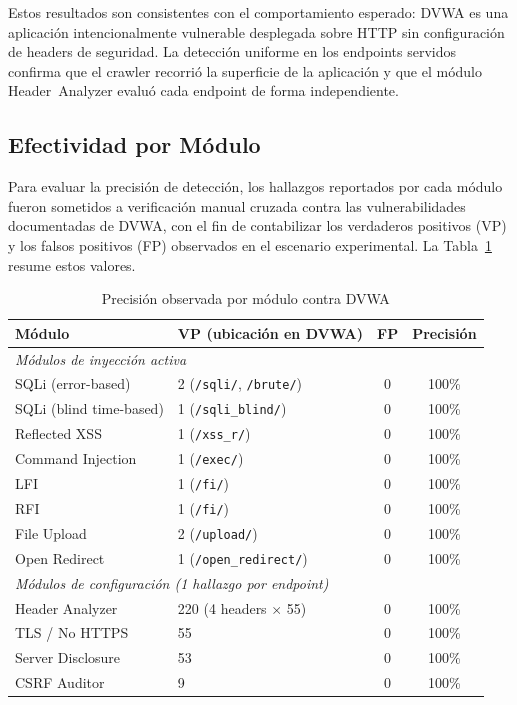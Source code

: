 \documentclass[12pt, a4paper]{article}
\begin{document}
Estos resultados son consistentes con el comportamiento esperado: DVWA es una
aplicación intencionalmente vulnerable desplegada sobre HTTP sin configuración
de headers de seguridad. La detección uniforme en los endpoints servidos
confirma que el crawler recorrió la superficie de la aplicación y que el
módulo Header~Analyzer evaluó cada endpoint de forma independiente.

\subsection{Efectividad por Módulo}

Para evaluar la precisión de detección, los hallazgos reportados por cada
módulo fueron sometidos a verificación manual cruzada contra las
vulnerabilidades documentadas de DVWA, con el fin de contabilizar los
verdaderos positivos (VP) y los falsos positivos (FP) observados en el
escenario experimental. La Tabla~\ref{tab:efectividad} resume estos valores.

\begin{table}[H]
    \centering
    \caption{Precisión observada por módulo contra DVWA}
    \label{tab:efectividad}
    \small
    \begin{tabular}{p{4cm} p{4.2cm} c c}
        \toprule
        \textbf{Módulo} & \textbf{VP (ubicación en DVWA)} & \textbf{FP} &
        \textbf{Precisión} \\
        \midrule
        \multicolumn{4}{l}{\textit{Módulos de inyección activa}} \\
        SQLi (error-based)  & 2 (\texttt{/sqli/}, \texttt{/brute/}) & 0 & 100\% \\
        SQLi (blind time-based) & 1 (\texttt{/sqli\_blind/})    & 0 & 100\% \\
        Reflected XSS      & 1 (\texttt{/xss\_r/})             & 0 & 100\% \\
        Command Injection  & 1 (\texttt{/exec/})               & 0 & 100\% \\
        LFI                & 1 (\texttt{/fi/})                 & 0 & 100\% \\
        RFI                & 1 (\texttt{/fi/})                 & 0 & 100\% \\
        File Upload        & 2 (\texttt{/upload/})             & 0 & 100\% \\
        Open Redirect      & 1 (\texttt{/open\_redirect/})     & 0 & 100\% \\
        \midrule
        \multicolumn{4}{l}{\textit{Módulos de configuración (1 hallazgo por endpoint)}} \\
        Header Analyzer    & 220 (4 headers $\times$ 55)       & 0 & 100\% \\
        TLS / No HTTPS     & 55                                & 0 & 100\% \\
        Server Disclosure  & 53                                & 0 & 100\% \\
        CSRF Auditor       & 9                                 & 0 & 100\% \\
        \bottomrule
    \end{tabular}
\end{table}
\end{document}
